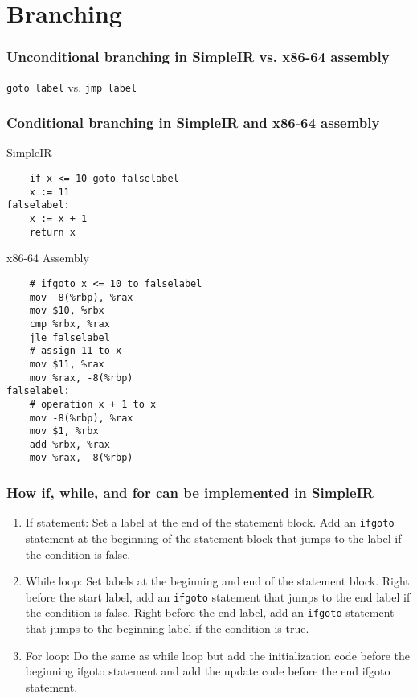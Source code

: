 \documentclass{article}
\newcommand{\inlinecode}[1]{\colorbox{gray!20}{\texttt{#1}}}
\begin{document}
\section*{Branching}

\subsubsection*{Unconditional branching in SimpleIR vs. x86-64 assembly}

\inlinecode{goto label} vs. \inlinecode{jmp label}

\subsubsection*{Conditional branching in SimpleIR and x86-64 assembly}

SimpleIR
\begin{verbatim}
    if x <= 10 goto falselabel
    x := 11
falselabel:
    x := x + 1
    return x
\end{verbatim}

x86-64 Assembly
\begin{verbatim}
    # ifgoto x <= 10 to falselabel
    mov	-8(%rbp), %rax
    mov	$10, %rbx
    cmp	%rbx, %rax
    jle falselabel
    # assign 11 to x
    mov	$11, %rax
    mov	%rax, -8(%rbp)
falselabel:
    # operation x + 1 to x
    mov	-8(%rbp), %rax
    mov	$1, %rbx
    add	%rbx, %rax
    mov	%rax, -8(%rbp)
\end{verbatim}

\subsubsection*{How if, while, and for can be implemented in SimpleIR}

\begin{enumerate}
    \item If statement: Set a label at the end of the statement block. Add an \inlinecode{ifgoto} statement at the beginning of the statement block that jumps to the label if the condition is false.
    \item While loop: Set labels at the beginning and end of the statement block. Right before the start label, add an \inlinecode{ifgoto} statement that jumps to the end label if the condition is false. Right before the end label, add an \inlinecode{ifgoto} statement that jumps to the beginning label if the condition is true.
    \item For loop: Do the same as while loop but add the initialization code before the beginning ifgoto statement and add the update code before the end ifgoto statement.
\end{enumerate}
\end{document}

